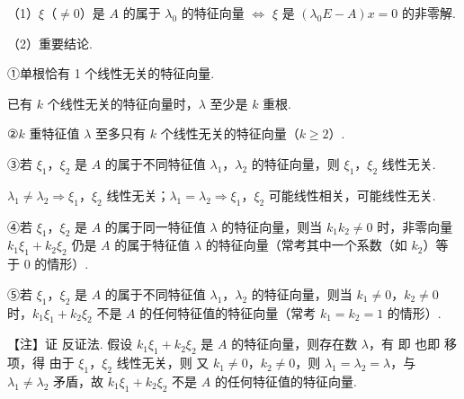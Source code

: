 

（1）$\xi$（$\ne0$）是 $A$ 的属于 $\lambda_0$ 的特征向量 $\iff$ $\xi$ 是 $(\lambda_0E-A)x=0$ 的非零解.


（2）重要结论.



①单根恰有 1 个线性无关的特征向量.

\begin{fnote}
已有 $k$ 个线性无关的特征向量时，$\lambda$ 至少是 $k$ 重根.
\end{fnote}

②$k$ 重特征值 $\lambda$ 至多只有 $k$ 个线性无关的特征向量（$k\ge2$）.

③若 $\xi_1$，$\xi_2$ 是 $A$ 的属于不同特征值 $\lambda_1$，$\lambda_2$ 的特征向量，则 $\xi_1$，$\xi_2$ 线性无关.

\begin{fnote}
$\lambda_1\ne\lambda_2\Rightarrow\xi_1$，$\xi_2$ 线性无关；$\lambda_1=\lambda_2\Rightarrow\xi_1$，$\xi_2$ 可能线性相关，可能线性无关.
\end{fnote}

④若 $\xi_1$，$\xi_2$ 是 $A$ 的属于同一特征值 $\lambda$ 的特征向量，则当 $k_1k_2\ne0$ 时，非零向量 $k_1\xi_1+k_2\xi_2$ 仍是 $A$ 的属于特征值 $\lambda$ 的特征向量（常考其中一个系数（如 $k_2$）等于 0 的情形）.

⑤若 $\xi_1$，$\xi_2$ 是 $A$ 的属于不同特征值 $\lambda_1$，$\lambda_2$ 的特征向量，则当 $k_1\ne0$，$k_2\ne0$ 时，$k_1\xi_1+k_2\xi_2$ 不是 $A$ 的任何特征值的特征向量（常考 $k_1=k_2=1$ 的情形）.

\begin{fnote}
【注】证 反证法. 假设 $k_1\xi_1+k_2\xi_2$ 是 $A$ 的特征向量，则存在数 $\lambda$，有
即
也即
移项，得
由于 $\xi_1$，$\xi_2$ 线性无关，则
又 $k_1\ne0$，$k_2\ne0$，则 $\lambda_1=\lambda_2=\lambda$，与 $\lambda_1\ne\lambda_2$ 矛盾，故 $k_1\xi_1+k_2\xi_2$ 不是 $A$ 的任何特征值的特征向量.
\end{fnote}


